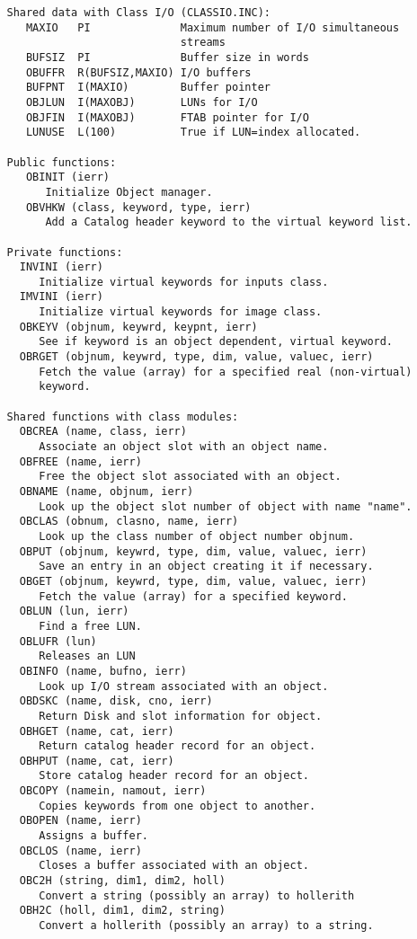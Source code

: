 {\begin{verbatim}
   Shared data with Class I/O (CLASSIO.INC):
      MAXIO   PI              Maximum number of I/O simultaneous
                              streams
      BUFSIZ  PI              Buffer size in words
      OBUFFR  R(BUFSIZ,MAXIO) I/O buffers
      BUFPNT  I(MAXIO)        Buffer pointer
      OBJLUN  I(MAXOBJ)       LUNs for I/O
      OBJFIN  I(MAXOBJ)       FTAB pointer for I/O
      LUNUSE  L(100)          True if LUN=index allocated.

   Public functions:
      OBINIT (ierr)
         Initialize Object manager.
      OBVHKW (class, keyword, type, ierr)
         Add a Catalog header keyword to the virtual keyword list.

   Private functions:
     INVINI (ierr)
        Initialize virtual keywords for inputs class.
     IMVINI (ierr)
        Initialize virtual keywords for image class.
     OBKEYV (objnum, keywrd, keypnt, ierr)
        See if keyword is an object dependent, virtual keyword.
     OBRGET (objnum, keywrd, type, dim, value, valuec, ierr)
        Fetch the value (array) for a specified real (non-virtual)
        keyword.

   Shared functions with class modules:
     OBCREA (name, class, ierr)
        Associate an object slot with an object name.
     OBFREE (name, ierr)
        Free the object slot associated with an object.
     OBNAME (name, objnum, ierr)
        Look up the object slot number of object with name "name".
     OBCLAS (obnum, clasno, name, ierr)
        Look up the class number of object number objnum.
     OBPUT (objnum, keywrd, type, dim, value, valuec, ierr)
        Save an entry in an object creating it if necessary.
     OBGET (objnum, keywrd, type, dim, value, valuec, ierr)
        Fetch the value (array) for a specified keyword.
     OBLUN (lun, ierr)
        Find a free LUN.
     OBLUFR (lun)
        Releases an LUN
     OBINFO (name, bufno, ierr)
        Look up I/O stream associated with an object.
     OBDSKC (name, disk, cno, ierr)
        Return Disk and slot information for object.
     OBHGET (name, cat, ierr)
        Return catalog header record for an object.
     OBHPUT (name, cat, ierr)
        Store catalog header record for an object.
     OBCOPY (namein, namout, ierr)
        Copies keywords from one object to another.
     OBOPEN (name, ierr)
        Assigns a buffer.
     OBCLOS (name, ierr)
        Closes a buffer associated with an object.
     OBC2H (string, dim1, dim2, holl)
        Convert a string (possibly an array) to hollerith
     OBH2C (holl, dim1, dim2, string)
        Convert a hollerith (possibly an array) to a string.
\end{verbatim}}

